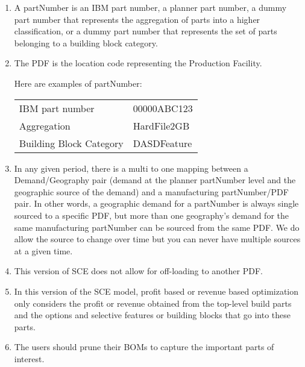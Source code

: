 \begin{enumerate}

\item A partNumber is an IBM part number, a planner part number, a dummy part number that
represents the aggregation of parts into a higher classification, or a
dummy part number that represents the set of parts belonging to a building block category.
\item The PDF is the location code representing the Production Facility.
   
Here are examples of partNumber:
\begin{center}
\begin{tabular}{ll}
  IBM part number  &   00000ABC123 \\
  Aggregation  &      HardFile2GB \\
  Building Block Category &   DASDFeature
\end{tabular}
\end{center}

\item In any given period, there is a multi to one mapping between a
Demand/Geography pair (demand at the planner partNumber level and the
geographic source of the demand) and a manufacturing partNumber/PDF
pair.  In other words, a geographic demand for a partNumber is always
single sourced to a specific PDF, but more than one geography's demand
for the same manufacturing partNumber can be sourced from the same PDF.
We do allow the source to change
over time but you can never have multiple sources at a given time.

\item This version of SCE does not allow for off-loading to another PDF.
 
 
\item In this version of the SCE model, profit based or revenue based 
   optimization only considers the profit or revenue obtained from the
   top-level build parts and the options and selective features or building blocks
   that go into these parts.

\item The users should prune their BOMs to capture the important parts of
   interest.  
 
\end{enumerate}


